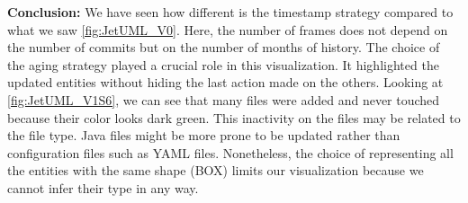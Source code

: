 \bigbreak
\textbf{Conclusion:}
We have seen how different is the timestamp strategy compared to what we saw \autoref{fig:JetUML_V0}. Here, the number of frames does not depend on the number of commits but on the number of months of history. 
The choice of the aging strategy played a crucial role in this visualization. It highlighted the updated entities without hiding the last action made on the others. Looking at \autoref{fig:JetUML_V1S6}, we can see that many files were added and never touched because their color looks dark green. This inactivity on the files may be related to the file type. Java files might be more prone to be updated rather than configuration files such as YAML files. Nonetheless, the choice of representing all the entities with the same shape (BOX) limits our visualization because we cannot infer their type in any way. 



